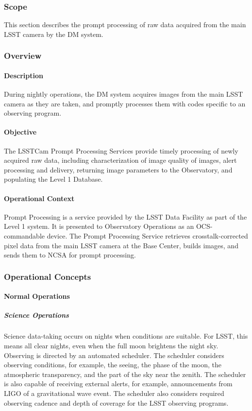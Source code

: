 \subsubsection{Scope}
This section describes the prompt processing of raw data acquired from the main
LSST camera by the DM system.

\subsubsection{Overview}

\paragraph{Description}
During nightly operations, the DM system acquires images from the main LSST
camera as they are taken, and promptly processes them with codes specific to an
observing program.

\paragraph{Objective}
The LSSTCam Prompt Processing Services provide timely processing of newly
acquired raw data, including characterization of image quality of images, alert processing and delivery,
returning image parameters to the Observatory, and populating the Level 1
Database.

\paragraph{Operational Context}
Prompt Processing is a service provided by the LSST Data Facility as part of the
Level 1 system. It is presented to Observatory Operations as an OCS-commandable
device. The Prompt Processing Service retrieves crosstalk-corrected pixel data
from the main LSST camera at the Base Center, builds images, and sends them
to NCSA for prompt processing.

\subsubsection{Operational Concepts}

\paragraph{Normal Operations}

\subparagraph{Science Operations}

Science data-taking occurs on nights when conditions are suitable. For
LSST, this means all clear nights, even when the full moon brightens
the night sky. Observing is directed by an automated scheduler. The
scheduler considers observing conditions, for example, the seeing, the
phase of the moon, the atmospheric transparency, and the part of the
sky near the zenith. The scheduler is also capable of receiving
external alerts, for example, announcements from LIGO of a
gravitational wave event. The scheduler also considers required
observing cadence and depth of coverage for the LSST observing
programs.

